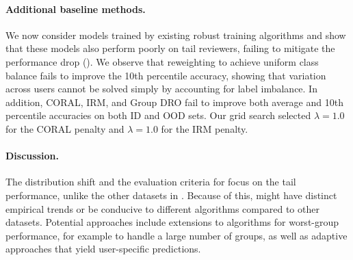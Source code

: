 \paragraph{Additional baseline methods.}
We now consider models trained by existing robust training algorithms and show that these models also perform poorly on tail reviewers, failing to mitigate the performance drop ().
We observe that reweighting to achieve uniform class balance fails to improve the 10th percentile accuracy, showing that variation across users cannot be solved simply by accounting for label imbalance.
In addition, CORAL, IRM, and Group DRO fail to improve both average and 10th percentile accuracies on both ID and OOD sets.
Our grid search selected $\lambda=1.0$ for the CORAL penalty and $\lambda=1.0$ for the IRM penalty.


\paragraph{Discussion.}
The distribution shift and the evaluation criteria for \Amazon focus on the tail performance, unlike the other datasets in \Wilds.
Because of this, \Amazon might have distinct empirical trends or be conducive to different algorithms compared to other datasets.
Potential approaches include extensions to algorithms for worst-group performance, for example to handle a large number of groups, as well as adaptive approaches that yield user-specific predictions.

